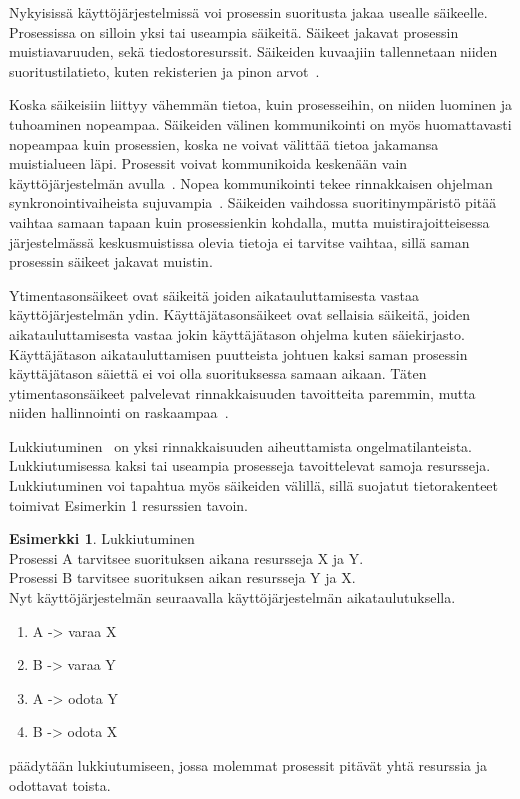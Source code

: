 \documentclass[finnish]{tktltiki2}
\theoremstyle{definition}
\newtheorem{esim}[lau]{Esimerkki}
\theoremstyle{remark}
\begin{document}
Nykyisissä käyttöjärjestelmissä voi prosessin suoritusta jakaa usealle
säikeelle. Prosessissa on silloin yksi tai useampia säikeitä.
Säikeet jakavat prosessin muistiavaruuden, sekä tiedostoresurssit.
Säikeiden kuvaajiin
tallennetaan niiden suoritustilatieto,
kuten rekisterien ja pinon arvot~\cite{stallings_operating_2018}.

Koska säikeisiin liittyy vähemmän tietoa, kuin prosesseihin,
on niiden luominen ja tuhoaminen nopeampaa. Säikeiden välinen
kommunikointi on myös huomattavasti nopeampaa kuin prosessien, koska
ne voivat välittää tietoa jakamansa muistialueen läpi.
Prosessit voivat kommunikoida keskenään vain käyttöjärjestelmän
avulla~\cite{stallings_operating_2018}.
Nopea
kommunikointi tekee rinnakkaisen ohjelman synkronointivaiheista
sujuvampia~\cite{stallings_operating_2018}. Säikeiden vaihdossa suoritinympäristö pitää vaihtaa
samaan tapaan kuin prosessienkin kohdalla, mutta muistirajoitteisessa 
järjestelmässä keskusmuistissa olevia
tietoja ei tarvitse vaihtaa, sillä saman prosessin säikeet jakavat
muistin.

Ytimentasonsäikeet ovat säikeitä joiden aikatauluttamisesta vastaa
käyttöjärjestelmän ydin. Käyttäjätasonsäikeet ovat sellaisia säikeitä,
joiden aikatauluttamisesta vastaa jokin käyttäjätason ohjelma kuten
säiekirjasto. Käyttäjätason aikatauluttamisen puutteista johtuen
kaksi saman prosessin käyttäjätason säiettä ei voi olla suorituksessa
samaan aikaan. Täten ytimentasonsäikeet palvelevat rinnakkaisuuden tavoitteita
paremmin, mutta niiden hallinnointi on raskaampaa~\cite{stallings_operating_2018}.

Lukkiutuminen~\cite{stallings_operating_2018}
on yksi rinnakkaisuuden aiheuttamista ongelmatilanteista.
Lukkiutumisessa kaksi tai useampia prosesseja tavoittelevat samoja resursseja.
Lukkiutuminen voi tapahtua myös säikeiden välillä, sillä
suojatut tietorakenteet toimivat Esimerkin 1 resurssien tavoin.

\begin{center}
\begin{esim}
 Lukkiutuminen \\
 Prosessi A tarvitsee suorituksen aikana resursseja X ja Y. \\
 Prosessi B tarvitsee suorituksen aikan resursseja Y ja X. \\
 Nyt käyttöjärjestelmän seuraavalla käyttöjärjestelmän aikataulutuksella.
 \begin{enumerate}
  \item A -> varaa X
  \item B -> varaa Y
  \item A -> odota Y
  \item B -> odota X 
 \end{enumerate}
 päädytään lukkiutumiseen, jossa molemmat prosessit
 pitävät yhtä resurssia ja odottavat toista.
\end{esim}
\end{center}
\end{document}
